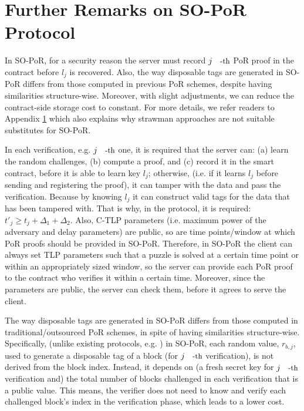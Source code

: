 
\section{Further Remarks on SO-PoR Protocol}\label{SO-PoR-discussion}


\begin{remark}
In SO-PoR, for a security reason the server must record $j\text{\small{-th}}$ PoR proof in the contract before $l_{\scriptscriptstyle j}$ is recovered. Also,  the way disposable tags are generated in SO-PoR  differs from those computed  in previous PoR schemes, despite having similarities structure-wise. Moreover, with slight adjustments, we can reduce the contract-side storage cost to constant.  For more details, we refer readers to Appendix \ref{SO-PoR-discussion} which also explains why strawman approaches are not suitable substitutes for SO-PoR. 
\end{remark}


\begin{remark}
 In each verification, e.g. $j\text{\small{-th}}$ one, it is required that the server can: (a) learn the random challenges, (b) compute a proof, and (c) record it in the smart contract, before it is able to learn key $l_{\scriptscriptstyle j}$; otherwise, (i.e. if it learns $l_{\scriptscriptstyle j}$ before sending and registering the proof), it can tamper with the data and pass the verification. Because by knowing $l_{\scriptscriptstyle j}$ it can construct valid tags for the data that has been tampered with. That is why, in the protocol, it is required: $t'_{\scriptscriptstyle j}\geq t_{\scriptscriptstyle j}+\Delta_{\scriptscriptstyle 1}+\Delta_{\scriptscriptstyle 2}$. Also, C-TLP parameters (i.e. maximum power of the adversary and delay parameters) are public, so are time points/window at which PoR proofs should be provided in SO-PoR. Therefore, in SO-PoR the client can always set TLP parameters such that a puzzle is solved at a certain time point or within an appropriately sized window, so the server can provide each PoR proof to the contract who verifies it within a certain time. Moreover, since the parameters are public, the server can check them, before it agrees to serve the client.
\end{remark}


\begin{remark}
The way disposable tags are generated in SO-PoR  differs from those computed  in traditional/outsourced PoR schemes, in spite of having similarities structure-wise. Specifically, (unlike existing protocols, e.g. \cite{DBLP:conf/asiacrypt/ShachamW08,armknecht2014outsourced}) in SO-PoR, each random value, $r_{\scriptscriptstyle b,j}$, used to generate  a disposable tag of a  block (for $j\text{\small{-th}}$ verification), is not derived from the block index. Instead, it depends on (a  fresh secret key for $j\text{\small{-th}}$ verification and) the total number of blocks challenged in each verification that is a public value. This means, the verifier does not need to know and verify each challenged block's index in the verification phase, which leads to a lower cost.  
\end{remark}


